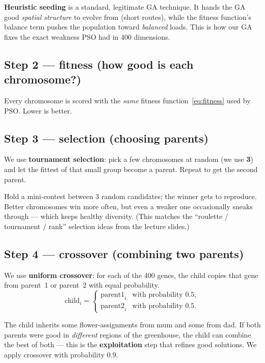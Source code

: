 \documentclass[11pt]{article}
\begin{document}
\begin{whybox}
\textbf{Heuristic seeding} is a standard, legitimate GA technique. It hands the
GA good \emph{spatial structure} to evolve from (short routes), while the fitness
function's balance term pushes the population toward \emph{balanced} loads. This
is how our GA fixes the exact weakness PSO had in 400 dimensions.
\end{whybox}

\subsection{Step 2 --- fitness (how good is each chromosome?)}
Every chromosome is scored with the \emph{same} fitness
function~\eqref{eq:fitness} used by PSO. Lower is better.

\subsection{Step 3 --- selection (choosing parents)}
We use \textbf{tournament selection}: pick a few chromosomes at random (we use
\textbf{3}) and let the fittest of that small group become a parent. Repeat to
get the second parent.

\begin{intuition}
Hold a mini-contest between 3 random candidates; the winner gets to reproduce.
Better chromosomes win more often, but even a weaker one occasionally sneaks
through --- which keeps healthy diversity. (This matches the ``roulette /
tournament / rank'' selection ideas from the lecture slides.)
\end{intuition}

\subsection{Step 4 --- crossover (combining two parents)}
We use \textbf{uniform crossover}: for each of the 400 genes, the child copies
that gene from parent~1 or parent~2 with equal probability.
\[
\text{child}_i =
\begin{cases}
\text{parent1}_i & \text{with probability } 0.5,\\
\text{parent2}_i & \text{with probability } 0.5.
\end{cases}
\]

\begin{intuition}
The child inherits some flower-assignments from mum and some from dad. If both
parents were good in \emph{different} regions of the greenhouse, the child can
combine the best of both --- this is the \textbf{exploitation} step that refines
good solutions. We apply crossover with probability $0.9$.
\end{intuition}
\end{document}
